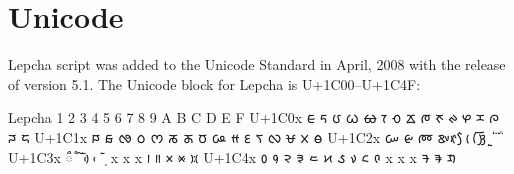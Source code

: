 \section{Unicode}

Lepcha script was added to the Unicode Standard in April, 2008 with the release of version 5.1.
The Unicode block for Lepcha is U+1C00–U+1C4F:
\begin{scriptexample}[]{Lepcha}
\bgroup
\lepcha
{}	1	2	3	4	5	6	7	8	9	A	B	C	D	E	F
U+1C0x	 ᰀ	ᰁ	ᰂ	ᰃ	ᰄ	ᰅ	ᰆ	ᰇ	ᰈ	ᰉ	ᰊ	ᰋ	ᰌ	ᰍ	ᰎ	ᰏ
U+1C1x	 ᰐ	ᰑ	ᰒ	ᰓ	ᰔ	ᰕ	ᰖ	ᰗ	ᰘ	ᰙ	ᰚ	ᰛ	ᰜ	ᰝ	ᰞ	ᰟ
U+1C2x	 ᰠ	ᰡ	ᰢ	ᰣ	ᰤ	ᰥ	ᰦ	ᰧ	ᰨ	ᰩ	ᰪ	ᰫ	ᰬ	ᰭ	ᰮ	ᰯ
U+1C3x	 ᰰ	ᰱ	ᰲ	ᰳ	ᰴ	ᰵ	ᰶ	᰷	x	x	x	᰻	᰼	᰽	᰾	᰿
U+1C4x	 ᱀	᱁	᱂	᱃	᱄	᱅	᱆	᱇	᱈	᱉	x	x	x	ᱍ	ᱎ	ᱏ

\egroup
\end{scriptexample}


